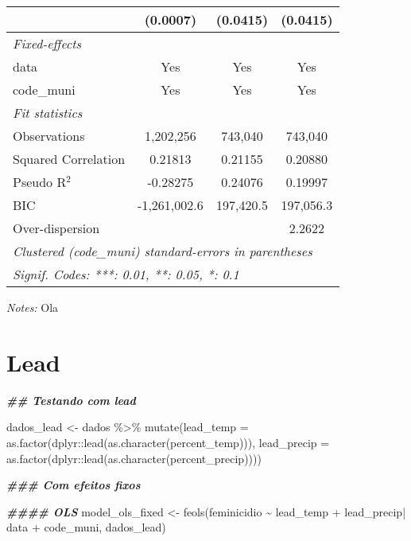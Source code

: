 \documentclass[
]{article}
\newenvironment{Shaded}{\begin{snugshade}}{\end{snugshade}}
\newcommand{\AttributeTok}[1]{\textcolor[rgb]{0.77,0.63,0.00}{#1}}
\newcommand{\DocumentationTok}[1]{\textcolor[rgb]{0.56,0.35,0.01}{\textbf{\textit{#1}}}}
\newcommand{\FunctionTok}[1]{\textcolor[rgb]{0.00,0.00,0.00}{#1}}
\newcommand{\NormalTok}[1]{#1}
\newcommand{\OtherTok}[1]{\textcolor[rgb]{0.56,0.35,0.01}{#1}}
\newcommand{\SpecialCharTok}[1]{\textcolor[rgb]{0.00,0.00,0.00}{#1}}
\begin{document}
\begin{tabular}{lccc}
  &(0.0007) & (0.0415) & (0.0415)\\
\midrule \emph{Fixed-effects}&   &   &  \\
data & Yes & Yes & Yes\\
code\_muni & Yes & Yes & Yes\\
\midrule \emph{Fit statistics}&  & & \\
Observations & 1,202,256&743,040&743,040\\
Squared Correlation & 0.21813&0.21155&0.20880\\
Pseudo R$^2$ & -0.28275&0.24076&0.19997\\
BIC & -1,261,002.6&197,420.5&197,056.3\\
Over-dispersion & &&2.2622\\
\midrule\midrule\multicolumn{4}{l}{\emph{Clustered (code\_muni) standard-errors in parentheses}}\\
\multicolumn{4}{l}{\emph{Signif. Codes: ***: 0.01, **: 0.05, *: 0.1}}\\
\end{tabular}

\medskip \emph{Notes:} Ola

\hypertarget{lead}{%
\section{Lead}\label{lead}}

\begin{Shaded}
\begin{Highlighting}[]
\DocumentationTok{\#\# Testando com lead}

\NormalTok{dados\_lead }\OtherTok{\textless{}{-}}\NormalTok{ dados }\SpecialCharTok{\%\textgreater{}\%} \FunctionTok{mutate}\NormalTok{(}\AttributeTok{lead\_temp =} \FunctionTok{as.factor}\NormalTok{(dplyr}\SpecialCharTok{::}\FunctionTok{lead}\NormalTok{(}\FunctionTok{as.character}\NormalTok{(percent\_temp))),}
                 \AttributeTok{lead\_precip =} \FunctionTok{as.factor}\NormalTok{(dplyr}\SpecialCharTok{::}\FunctionTok{lead}\NormalTok{(}\FunctionTok{as.character}\NormalTok{(percent\_precip))))}

\DocumentationTok{\#\#\# Com efeitos fixos}

\DocumentationTok{\#\#\#\# OLS}
\NormalTok{model\_ols\_fixed }\OtherTok{\textless{}{-}} \FunctionTok{feols}\NormalTok{(feminicidio  }\SpecialCharTok{\textasciitilde{}}\NormalTok{ lead\_temp }\SpecialCharTok{+}\NormalTok{ lead\_precip}\SpecialCharTok{|}\NormalTok{ data }\SpecialCharTok{+}\NormalTok{ code\_muni, dados\_lead)}
\end{Highlighting}
\end{Shaded}
\end{document}

